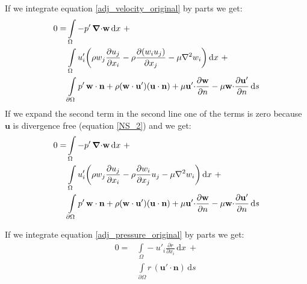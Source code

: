 \documentclass[12pt, a4paper]{article}
\begin{document}
If we integrate equation \ref{adj_velocity_original} by parts we get:
\begin{equation}
\begin{split}
0 = &\int\limits_{\Omega}
-p' \, \boldsymbol{\nabla} \mathbf{\cdot w}
\, \mathrm{d}x \ + \\
&\int\limits_{\Omega} u'_i \bigg{(}
\rho w_j \frac{\partial u_j}{\partial x_i} - 
\rho \frac{\partial (w_i u_j)}{\partial x_j} - 
\mu \nabla^2 w_i
\bigg{)} \, \mathrm{d}x \ + \\
&\int\limits_{\partial \Omega}
p' \, \mathbf{w \cdot n} + 
\rho (\mathbf{w \cdot u'}) (\mathbf{u \cdot n}) + 
\mu \mathbf{u' \cdot} \frac{\partial \mathbf{w}}{\partial n} - 
\mu \mathbf{w \cdot} \frac{\partial \mathbf{u'}}{\partial n}
\, \mathrm{d}s
\end{split}
\end{equation}
If we expand the second term in the second line one of the terms is zero because $\mathbf{u}$ is divergence free (equation \ref{NS_2}) and we get:
\begin{equation} \label{adj_velocity_parts}
\begin{split}
0 = &\int\limits_{\Omega}
-p' \, \boldsymbol{\nabla} \mathbf{\cdot w}
\, \mathrm{d}x \ + \\
&\int\limits_{\Omega} u'_i \bigg{(}
\rho w_j \frac{\partial u_j}{\partial x_i} - 
\rho \frac{\partial w_i}{\partial x_j} u_j - 
\mu \nabla^2 w_i
\bigg{)} \, \mathrm{d}x \ + \\
&\int\limits_{\partial \Omega}
p' \, \mathbf{w \cdot n} + 
\rho (\mathbf{w \cdot u'}) (\mathbf{u \cdot n}) + 
\mu \mathbf{u' \cdot} \frac{\partial \mathbf{w}}{\partial n} - 
\mu \mathbf{w \cdot} \frac{\partial \mathbf{u'}}{\partial n}
\, \mathrm{d}s
\end{split}
\end{equation}

If we integrate equation \ref{adj_pressure_original} by parts we get:
\begin{equation} \label{adj_pressure_parts}
\begin{split}
0 = &\int\limits_{\Omega}
- u'_i \frac{\partial r}{\partial x_i}
\, \mathrm{d}x \ + \\
&\int\limits_{\partial \Omega}
r \, (\mathbf{u' \cdot n})
\, \mathrm{d}s
\end{split}
\end{equation}
\end{document}
